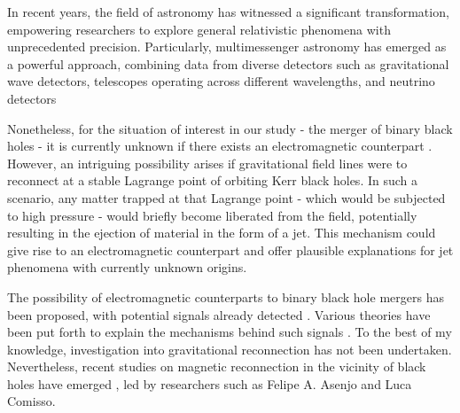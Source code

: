 In recent years, the field of astronomy has witnessed a significant transformation, empowering researchers to explore general relativistic phenomena with unprecedented precision. Particularly, multimessenger astronomy has emerged as a powerful approach, combining data from diverse detectors such as gravitational wave detectors, telescopes operating across different wavelengths, and neutrino detectors 

Nonetheless, for the situation of interest in our study - the merger of binary black holes - it is currently unknown if there exists an electromagnetic counterpart \cite{perna2019limits}. However, an intriguing possibility arises if gravitational field lines were to reconnect at a stable Lagrange point of orbiting Kerr black holes. In such a scenario, any matter trapped at that Lagrange point - which would be subjected to high pressure - would briefly become liberated from the field, potentially resulting in the ejection of material in the form of a jet. This mechanism could give rise to an electromagnetic counterpart and offer plausible explanations for jet phenomena with currently unknown origins.

The possibility of electromagnetic counterparts to binary black hole mergers has been proposed, with potential signals already detected \cite{graham2020candidate}. Various theories have been put forth to explain the mechanisms behind such signals \cite{kelly2017prompt}. To the best of my knowledge, investigation into gravitational reconnection has not been undertaken. Nevertheless, recent studies on magnetic reconnection in the vicinity of black holes have emerged \cite{AsenjoFelipeA2017RMRi,comisso2021magnetic}, led by researchers such as Felipe A. Asenjo and Luca Comisso.


% 





